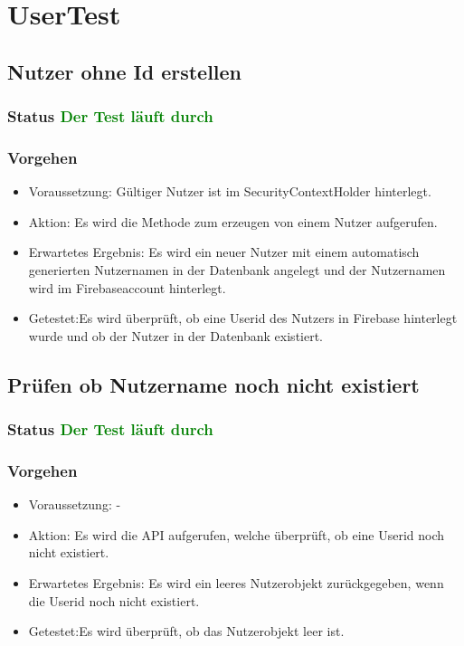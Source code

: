 \section{UserTest}
\subsection{Nutzer ohne Id erstellen}
\subsubsection{Status \textcolor{green}{ Der Test läuft durch} }
\subsubsection{Vorgehen}
\begin{itemize}
	\item Voraussetzung: Gültiger Nutzer ist im SecurityContextHolder hinterlegt.
	\item Aktion: Es wird die Methode zum erzeugen von einem Nutzer aufgerufen.
	\item Erwartetes Ergebnis: Es wird ein neuer Nutzer mit einem automatisch generierten Nutzernamen in der Datenbank angelegt und der Nutzernamen wird im Firebaseaccount hinterlegt.
	\item Getestet:Es wird überprüft, ob eine Userid des Nutzers in Firebase hinterlegt wurde und ob der Nutzer in der Datenbank existiert.
\end{itemize}

\subsection{Prüfen ob Nutzername noch nicht existiert}
\subsubsection{Status \textcolor{green}{ Der Test läuft durch} }
\subsubsection{Vorgehen}
\begin{itemize}
	\item Voraussetzung: -
	\item Aktion: Es wird die API aufgerufen, welche überprüft, ob eine Userid noch nicht existiert.
	\item Erwartetes Ergebnis: Es wird ein leeres Nutzerobjekt zurückgegeben, wenn die Userid noch nicht existiert.
	\item Getestet:Es wird überprüft, ob das Nutzerobjekt leer ist.
\end{itemize}


